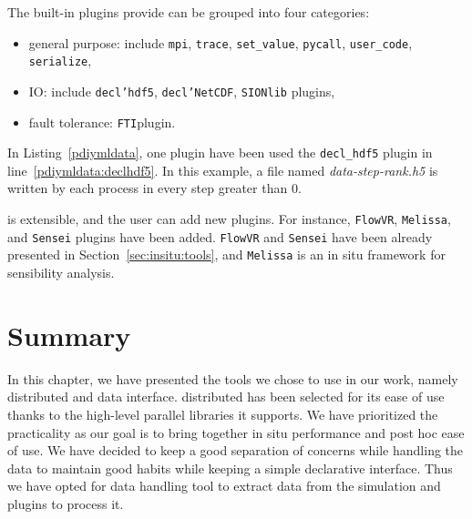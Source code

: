 The built-in plugins \pdi provide can be grouped into four categories: 
\begin{itemize}
    \item general purpose: include \texttt{mpi}, \texttt{trace}, \texttt{set\_value}, \texttt{pycall}, \texttt{user\_code}, \texttt{serialize},  
    \item IO: include \texttt{decl’hdf5}, \texttt{decl’NetCDF}, \texttt{SIONlib} plugins,
    \item fault tolerance: \texttt{FTI}plugin.
\end{itemize}

In Listing~\ref{pdiymldata}, one plugin have been used the \texttt{decl\_hdf5} plugin in line~\ref{pdiymldata:declhdf5}. In this example, a file named \textit{data-step-rank.h5} is written by each process in every step greater than 0. 

\pdi is extensible, and the user can add new plugins. For instance, \texttt{FlowVR}, \texttt{Melissa}, and \texttt{Sensei} plugins have been added. \texttt{FlowVR} and \texttt{Sensei} have been already presented in Section~\ref{sec:insitu:tools}, and \texttt{Melissa}\cite{terraz_melissa} is an in situ framework for sensibility analysis. 


\section{Summary}
In this chapter, we have presented the tools we chose to use in our work, namely \dask distributed and \pdi data interface.
\dask distributed has been selected for its ease of use thanks to the high-level parallel libraries it supports. We have prioritized the practicality as our goal is to bring together in situ performance and post hoc ease of use.
We have decided to keep a good separation of concerns while handling the data to maintain good habits while keeping a simple declarative interface. Thus we have opted for \pdi data handling tool to extract data from the simulation and \pdi plugins to process it. 